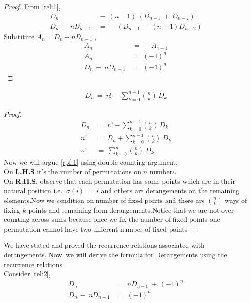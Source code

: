 \begin{proof}
From \ref{rel:1}, 
\begin{align}
     D_n ~&=~ (n-1)~(D_{n-1}~+~D_{n-2}) \nonumber \\
     D_n~-~nD_{n-1}~&=~-(D_{n-1}~-~(n-1)D_{n-2}) \nonumber
     \end{align}
     Substitute $A_n = D_n - nD_{n-1}$ \label{rpf:1},\\
    \begin{align}
     A_n~&=~-A_{n-1} \nonumber\\
     A_n~&=~(-1)^n \nonumber\\ 
     D_n~-~nD_{n-1}~&=~(-1)^n \nonumber
\end{align}
\end{proof}
\begin{recurrence relation} \label{rel:3}
\begin{align}
    D_n ~=~ n! - \sum_{k=0}^{n-1} {n \choose k}~D_k   
\end{align}
\end{recurrence relation}
\begin{proof}
\begin{align}
    D_n ~&=~ n! - \sum_{k=0}^{n-1} {n \choose k}~D_k \nonumber \\
         n! ~&=~ D_n + \sum_{k=0}^{n-1} {n \choose k}~D_k \nonumber \\
     n! ~&=~ \sum_{k=0}^{n} {n \choose k}~D_k \label{rpf:1} 
\end{align}
Now we will argue \ref{rpf:1} using double counting argument.\\
On \textbf{L.H.S} it's the number of permutations on $n$ numbers. \\
On \textbf{R.H.S}, observe that each permutation has some points which are in their natural position i.e., $\sigma(i)~=~i$ and others are derangements on the remaining elements.Now we condition on number of fixed points and there are ${n\choose k }$ ways of fixing $k$ points and remaining form derangements.Notice that we are not over counting across sums because once we fix the number of fixed points one permutation cannot have two different number of fixed points.   
\end{proof}
\noindent
We have stated and proved the recurrence relations associated with derangements.
Now, we will derive the formula for Derangements using the recurrence relations.\\
Consider \ref{rel:2},  \\
\begin{align}
    D_n ~&=~ nD_{n-1}~+~(-1)^n \nonumber\\
    D_n ~-~ nD_{n-1} ~&=~ (-1)^n \nonumber
    \end{align}
